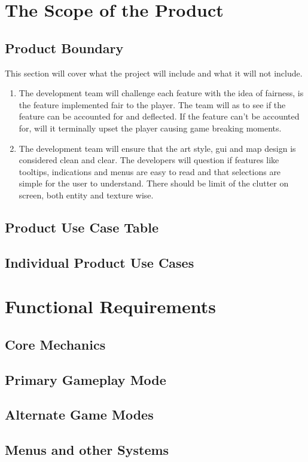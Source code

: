 \documentclass{article}
\begin{document}
\section{The Scope of the Product}
\subsection{Product Boundary}
\quad This section will cover what the project will include and what it will not include.
\begin{enumerate}[{PB}1. ]
	\item The development team will challenge each feature with the idea of fairness, is the feature implemented fair to the player. The team will as to see if the feature can be accounted for and deflected. If the feature can't be accounted for, will it terminally upset the player causing game breaking moments.
	\item The development team will ensure that the art style, gui and map design is considered clean and clear. The developers will question if features like tooltips, indications and menus are easy to read and that selections are simple for the user to understand.  There should be limit of the clutter on screen, both entity and texture wise.
\end{enumerate}
\subsection{Product Use Case Table}
\subsection{Individual Product Use Cases}
\section{Functional Requirements}
\subsection{Core Mechanics}
\subsection{Primary Gameplay Mode}
\subsection{Alternate Game Modes}
\subsection{Menus and other Systems}
\end{document}

